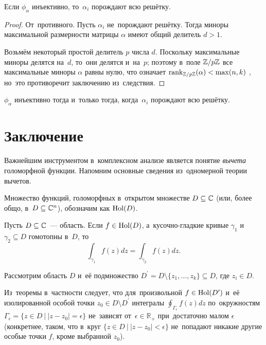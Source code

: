 \documentclass{article}
\begin{document}
\begin{lemma*}
    Если $\phi_\alpha$ инъективно, то~$\alpha_i$ порождают всю решётку.
\end{lemma*}

\begin{proof}
    От~противного. Пусть $\alpha_i$ не~порождают решётку. Тогда миноры максимальной размерности
    матрицы $\alpha$ имеют общий делитель $d > 1$.

    Возьмём некоторый простой делитель $p$ числа $d$. Поскольку максимальные миноры
    делятся на~$d$, то~они делятся и~на~$p$; поэтому в~поле $\mathbb{Z} / p \mathbb{Z}$
    все максимальные миноры $\alpha$ равны нулю, что означает $\mathrm{rank}_{\mathbb{Z} / p \mathbb{Z}}(\alpha) < \max(n, k)$ \cite{Brbk70},
    но~это противоречит заключению из~следствия.
\end{proof}

\begin{consequence*}
    $\phi_\alpha$ инъективно тогда и~только тогда, когда~$\alpha_i$ порождают всю решётку.
\end{consequence*}

\section{Заключение}

Важнейшим инструментом в~комплексном анализе является понятие \textit{вычета} голоморфной функции.
Напомним основные сведения из~одномерной теории вычетов.

Множество функций, голоморфных в~открытом множестве $D \subseteq \mathbb{C}$ (или, более общо, в~$D \subseteq \mathbb{C}^n$), обозначим как $\mathrm{Hol}(D)$.

\begin{theorem*}
  Пусть $D \subseteq \mathbb{C}$~— область. Если $f \in \mathrm{Hol}(D)$, а~кусочно-гладкие кривые $\gamma_1$
  и~$\gamma_2 \subseteq D$ гомотопны в~$D$, то
  $$
    \int_{\gamma_1} f(z)dz = \int_{\gamma_2} f(z)dz.
  $$
\end{theorem*}

Рассмотрим область $D$ и~её подмножество $D^\prime = D \setminus \{ z_1, \ldots, z_k \} \subseteq D$, где $z_i \in D$.

Из~теоремы в~частности следует, что для~произвольной $f \in \mathrm{Hol}(D^\prime)$ и~её изолированной
особой точки $z_0 \in D \setminus D^\prime$ интегралы $\oint_{\Gamma_\epsilon} f(z)dz$ по~окружностям
$\Gamma_\epsilon = \{ z \in D \ | \ |z - z_0| = \epsilon \}$ не~зависят от~$\epsilon \in \mathbb{R}_{+}$
при~достаточно малом $\epsilon$ (конкретнее, таком, что в~круг $\{ z \in D \ | \ |z - z_0| < \epsilon \}$
не~попадают никакие другие особые точки $f$, кроме выбранной $z_0$).
\end{document}
